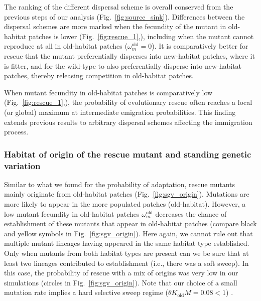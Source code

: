 \documentclass[11pt]{article}
\begin{document}
The ranking of the different dispersal scheme is overall conserved from the previous steps of our analysis (Fig.~\ref{fig:source_sink}). Differences between the dispersal schemes are more marked when the fecundity of the mutant in old-habitat patches is lower (Fig.~\ref{fig:rescue_1},), including when the mutant cannot reproduce at all in old-habitat patches ($\omega^\text{old}_m=0$). It is comparatively better for rescue that the mutant preferentially disperses into new-habitat patches, where it is fitter, and for the wild-type to also preferentially disperse into new-habitat patches, thereby releasing competition in old-habitat patches. 

When mutant fecundity in old-habitat patches is comparatively low (Fig.~\ref{fig:rescue_1},), the probability of evolutionary rescue often reaches a local (or global) maximum at intermediate emigration probabilities. This finding extends previous results \citep{uecker_2014, tomasini_2019} to arbitrary dispersal schemes affecting the immigration process.

\subsubsection*{Habitat of origin of the rescue mutant and standing genetic variation}
Similar to what we found for the probability of adaptation, rescue mutants mainly originate from old-habitat patches (Fig.~\ref{fig:sgv_origin}). Mutations are more likely to appear in the more populated patches (old-habitat). However, a low mutant fecundity in old-habitat patches $\omega^\text{old}_m$ decreases the chance of establishment of these mutants that appear in old-habitat patches (compare black and yellow symbols in Fig.~\ref{fig:sgv_origin}). Here again, we cannot rule out that multiple mutant lineages having appeared in the same habitat type established.  Only when mutants from both habitat types are present can we be sure that at least two lineages contributed to establishment (i.e., there was a soft sweep). In this case, the probability of rescue with a mix of origins was very low in our simulations (circles in Fig.~\ref{fig:sgv_origin}). Note that our choice of a small mutation rate implies a hard selective sweep regime ($\theta K_{\text{old}} M = 0.08<1$) \citep{wilson_2018, hermisson_2017}. 
\end{document}
